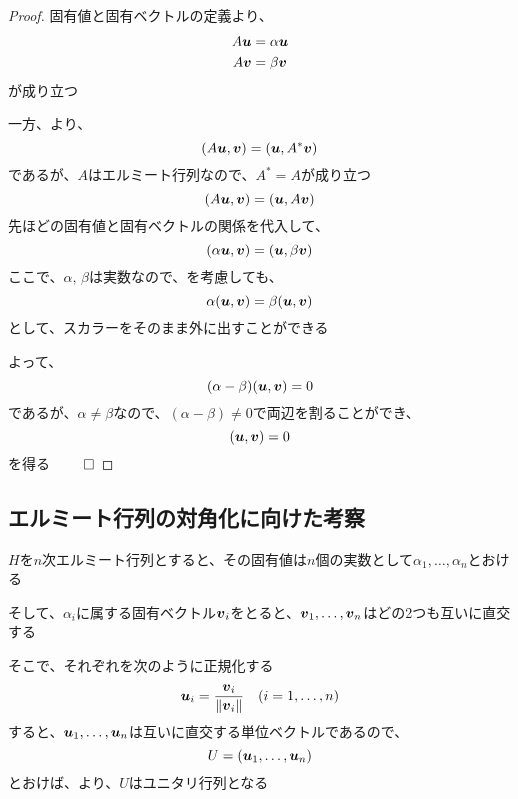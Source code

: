 \documentclass[../../../topic_linear-algebra]{subfiles}
\begin{document}
\begin{proof}
  固有値と固有ベクトルの定義より、
  \begin{align*}
    A\vb*{u} & = \alpha \vb*{u} \\
    A\vb*{v} & = \beta \vb*{v}
  \end{align*}
  が成り立つ

  \br

  一方、より、
  \begin{equation*}
    (A\vb*{u}, \vb*{v}) = (\vb*{u}, A^*\vb*{v})
  \end{equation*}
  であるが、$A$はエルミート行列なので、$A^* = A$が成り立つ
  \begin{equation*}
    (A\vb*{u}, \vb*{v}) = (\vb*{u}, A\vb*{v})
  \end{equation*}
  先ほどの固有値と固有ベクトルの関係を代入して、
  \begin{equation*}
    (\alpha \vb*{u}, \vb*{v}) = (\vb*{u}, \beta \vb*{v})
  \end{equation*}
  ここで、$\alpha,\,\beta$は実数なので、を考慮しても、
  \begin{equation*}
    \alpha (\vb*{u}, \vb*{v}) = \beta (\vb*{u}, \vb*{v})
  \end{equation*}
  として、スカラーをそのまま外に出すことができる

  \br

  よって、
  \begin{equation*}
    (\alpha - \beta)(\vb*{u}, \vb*{v}) = 0
  \end{equation*}
  であるが、$\alpha \neq \beta$なので、$(\alpha - \beta) \neq 0$で両辺を割ることができ、
  \begin{equation*}
    (\vb*{u}, \vb*{v}) = 0
  \end{equation*}
  を得る $\qed$
\end{proof}

\subsection{エルミート行列の対角化に向けた考察}

$H$を$n$次エルミート行列とすると、その固有値は$n$個の実数として$\alpha_1,\ldots,\alpha_n$とおける

そして、$\alpha_i$に属する固有ベクトル$\vb*{v}_i$をとると、$\vb*{v}_1, \ldots, \vb*{v}_n$はどの2つも互いに直交する

\br

そこで、それぞれを次のように正規化する
\begin{equation*}
  \vb*{u}_i = \frac{\vb*{v}_i}{\|\vb*{v}_i\|} \quad (i = 1, \ldots, n)
\end{equation*}
すると、$\vb*{u}_1, \ldots, \vb*{u}_n$は互いに直交する単位ベクトルであるので、
\begin{equation*}
  U = (\vb*{u}_1, \ldots, \vb*{u}_n)
\end{equation*}
とおけば、より、$U$はユニタリ行列となる
\end{document}
